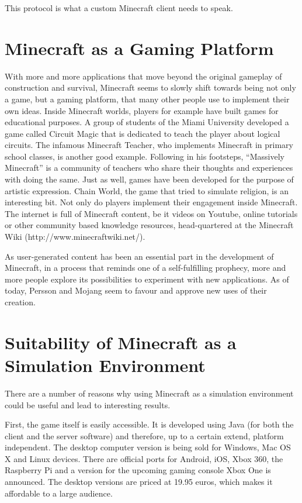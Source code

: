 This protocol is what a custom Minecraft client needs to speak.

    \section{Minecraft as a Gaming Platform}
With more and more applications that move beyond the original gameplay of construction and survival, Minecraft seems to slowly shift towards being not only a game, but a gaming platform, that many other people use to implement their own ideas. Inside Minecraft worlds, players for example have built games for educational purposes. A group of students of the Miami University developed a game called Circuit Magic that is dedicated to teach the player about logical circuits. The infamous Minecraft Teacher, who implements Minecraft in primary school classes, is another good example. Following in his footsteps, ``Massively Minecraft'' is a community of teachers who share their thoughts and experiences with doing the same. Just as well, games have been developed for the purpose of artistic expression. Chain World, the game that tried to simulate religion, is an interesting bit. Not only do players implement their engagement inside Minecraft. The internet is full of Minecraft content, be it videos on Youtube, online tutorials or other community based knowledge resources, head-quartered at the Minecraft Wiki (http://www.minecraftwiki.net/).~\cite{Duncan:2011:MBC:2207096.2207097}

As user-generated content has been an essential part in the development of Minecraft, in a process that reminds one of a self-fulfilling prophecy, more and more people explore its possibilities to experiment with new applications. As of today, Persson and Mojang seem to favour and approve new uses of their creation.~\cite{Duncan:2011:MBC:2207096.2207097}

    \section{Suitability of Minecraft as a Simulation Environment}
There are a number of reasons why using Minecraft as a simulation environment could be useful and lead to interesting results.

First, the game itself is easily accessible. It is developed using Java (for both the client and the server software) and therefore, up to a certain extend, platform independent. The desktop computer version is being sold for Windows, Mac OS X and Linux devices. There are official ports for Android, iOS, Xbox 360, the Raspberry Pi and a version for the upcoming gaming console Xbox One is announced. The desktop versions are priced at 19.95 euros, which makes it affordable to a large audience.

